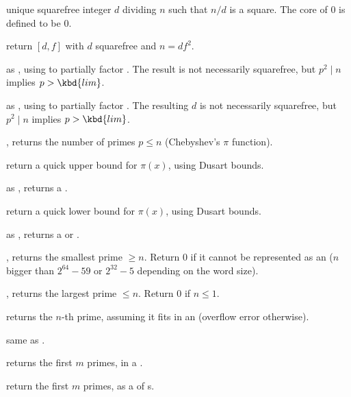  unique squarefree integer $d$ dividing $n$ such that
$n/d$ is a square. The core of $0$ is defined to be $0$.

 return $[d,f]$ with $d$ squarefree and $n = df^2$.

 as , using
 to partially factor . The result is not
necessarily squarefree, but $p^2 \mid n$ implies $p > \kbd{lim}$.

 as , using
 to partially factor . The resulting $d$ is not
necessarily squarefree, but $p^2 \mid n$ implies $p > \kbd{lim}$.



, returns the number of primes $p\leq n$
(Chebyshev's $\pi$ function).

 return a quick upper bound for
$\pi(x)$, using Dusart bounds.

 as , returns a
.

 return a quick lower bound for
$\pi(x)$, using Dusart bounds.

 as , returns
a  or .


, returns the smallest prime $\geq n$. Return
$0$ if it cannot be represented as an  ($n$ bigger than $2^{64} -
59$ or $2^{32} - 5$ depending on the word size).

, returns the largest prime $\leq n$. Return
$0$ if $n\leq 1$.

 returns the $n$-th prime, assuming it fits in an
 (overflow error otherwise).

 same as .

 returns the first $m$ primes, in a
.

 return the first $m$ primes, as a  of
s.


